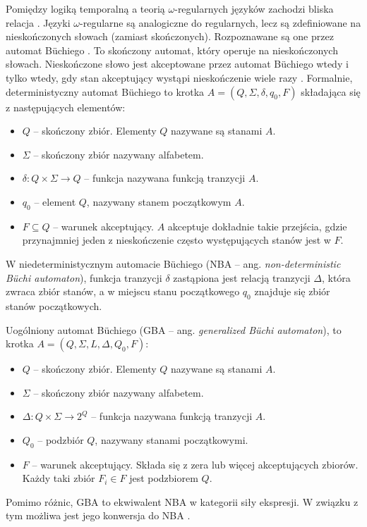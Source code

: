 Pomiędzy logiką temporalną a teorią $\omega$-regularnych języków zachodzi bliska relacja \cite{Sis83}\cite{Wol83}.
Języki $\omega$-regularne są analogiczne do regularnych, lecz są zdefiniowane na nieskończonych słowach (zamiast skończonych).
Rozpoznawane są one przez automat Büchiego \cite{Buch66}.
To skończony automat, który operuje na nieskończonych słowach.
Nieskończone słowo jest akceptowane przez automat Büchiego wtedy i tylko wtedy, gdy stan akceptujący wystąpi nieskończenie wiele razy \cite{Sis87}.
Formalnie, deterministyczny automat Büchiego to krotka $A = (Q,\Sigma,\delta,q_0,F)$ składająca się z następujących elementów:
\begin{itemize}
\item $Q$ -- skończony zbiór. Elementy $Q$ nazywane są stanami $A$.
\item $\Sigma$ -- skończony zbiór nazywany alfabetem.
\item $\delta: Q \times \Sigma \rightarrow Q$ -- funkcja nazywana funkcją tranzycji $A$.
\item $q_0$ -- element $Q$, nazywany stanem początkowym $A$.
\item $F \subseteq Q$ -- warunek akceptujący. $A$ akceptuje dokładnie takie przejścia, gdzie przynajmniej jeden z nieskończenie często występujących stanów jest w $F$.
\end{itemize}
W niedeterministycznym automacie Büchiego (NBA -- ang. \textit{non-deterministic Büchi automaton}), funkcja tranzycji $\delta$ zastąpiona jest relacją tranzycji $\Delta$, która zwraca zbiór stanów, a w miejscu stanu początkowego $q_0$ znajduje się zbiór stanów początkowych.

Uogólniony automat Büchiego (GBA -- ang. \textit{generalized Büchi automaton}), to krotka $A = (Q,\Sigma,L,\Delta,Q_0,F)$:
\begin{itemize}
\item $Q$ -- skończony zbiór. Elementy $Q$ nazywane są stanami $A$.
\item $\Sigma$ -- skończony zbiór nazywany alfabetem.
\item $\Delta: Q \times \Sigma \rightarrow 2^Q$ -- funkcja nazywana funkcją tranzycji $A$.
\item $Q_0$ -- podzbiór $Q$, nazywany stanami początkowymi.
\item $F$ -- warunek akceptujący. Składa się z zera lub więcej akceptujących zbiorów. Każdy taki zbiór $F_i \in F$ jest podzbiorem $Q$.
\end{itemize}
Pomimo różnic, GBA to ekwiwalent NBA w kategorii siły ekspresji.
W związku z tym możliwa jest jego konwersja do NBA \cite{Mer14}\cite{Dol95}.

